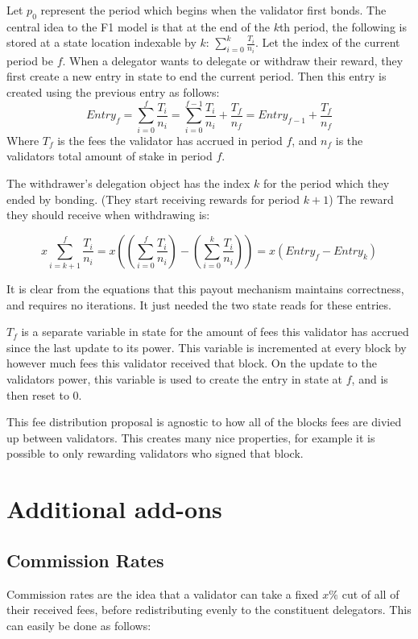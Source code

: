 \documentclass[]{article}
\begin{document}
Let $p_0$ represent the period which begins when the validator first bonds.
The central idea to the F1 model is that at the end of the $k$th period,
the following is stored at a state location indexable by $k$: $\sum_{i=0}^{k}\frac{T_i}{n_i}$.
Let the index of the current period be $f$. 
When a delegator wants to delegate or withdraw their reward, they first create a new entry in state to end the current period.
Then this entry is created using the previous entry as follows:
$$Entry_f = \sum_{i=0}^{f}\frac{T_i}{n_i} = \sum_{i=0}^{f-1}\frac{T_i}{n_i} + \frac{T_f}{n_f} = Entry_{f-1} + \frac{T_f}{n_f}$$
Where $T_f$ is the fees the validator has accrued in period $f$, and $n_f$ is the validators total amount of stake in period $f$.

The withdrawer's delegation object has the index $k$ for the period which they ended by bonding. (They start receiving rewards for period $k + 1$)
The reward they should receive when withdrawing is:

$$x \sum_{i = k + 1}^{f} \frac{T_i}{n_i} = x\left(\left(\sum_{i=0}^{f}\frac{T_i}{n_i}\right) - \left(\sum_{i=0}^{k}\frac{T_i}{n_i}\right)\right) = x\left(Entry_f - Entry_k\right)$$

It is clear from the equations that this payout mechanism maintains correctness, and requires no iterations. It just needed the two state reads for these entries.

$T_f$ is a separate variable in state for the amount of fees this validator has accrued since the last update to its power.
This variable is incremented at every block by however much fees this validator received that block.
On the update to the validators power, this variable is used to create the entry in state at $f$, and is then reset to 0.

This fee distribution proposal is agnostic to how all of the blocks fees are divied up between validators.
This creates many nice properties, for example it is possible to only rewarding validators who signed that block.
 
\section{Additional add-ons}
\subsection{Commission Rates}
Commission rates are the idea that a validator can take a fixed $x\%$ cut of all of their received fees, before redistributing evenly to the constituent delegators.
This can easily be done as follows:
\end{document}
